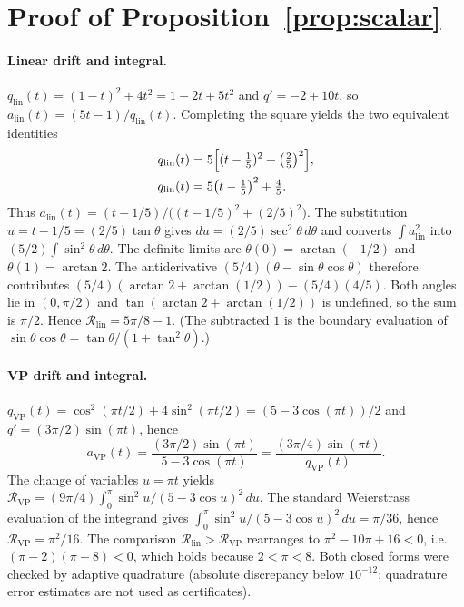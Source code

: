 \documentclass[11pt,a4paper]{article}
\theoremstyle{remark}
\newcommand{\cR}{\mathcal{R}}
\begin{document}
\FloatBarrier
{\small
\setlength{\bibsep}{3pt plus 1pt minus 1pt}


}

\appendix
{}
\setcounter{topnumber}{4}
\setcounter{bottomnumber}{3}
\setcounter{totalnumber}{6}
\renewcommand{\topfraction}{0.92}
\renewcommand{\textfraction}{0.05}
\renewcommand{\floatpagefraction}{0.85}
\setlength{\textfloatsep}{10pt plus 2pt minus 4pt}
\setlength{\floatsep}{8pt plus 2pt minus 3pt}
\setlength{\intextsep}{8pt plus 2pt minus 3pt}
\section{Proof of Proposition~\ref{prop:scalar}}
\label{app:scalar}

\paragraph{Linear drift and integral.}
$q_{\mathrm{lin}}(t)=(1-t)^2+4t^2=1-2t+5t^2$ and
$q'= -2+10t$, so
$a_{\mathrm{lin}}(t)=(5t-1)/q_{\mathrm{lin}}(t)$. Completing the square yields the two equivalent identities
\begin{align}
  q_{\mathrm{lin}}(t)
  &= 5\Bigl[(t-\tfrac15)^2+\bigl(\tfrac25\bigr)^2\Bigr],
  \label{eq:q-bracket}\\
  q_{\mathrm{lin}}(t)
  &= 5\bigl(t-\tfrac15\bigr)^2+\tfrac45.
  \label{eq:q-plus}
\end{align}
Thus
$a_{\mathrm{lin}}(t)=(t-1/5)/\bigl((t-1/5)^2+(2/5)^2\bigr)$.
The substitution $u=t-1/5=(2/5)\tan\theta$ gives
$du=(2/5)\sec^2\theta\,d\theta$ and converts $\int a_{\mathrm{lin}}^2$ into
$(5/2)\int\sin^2\theta\,d\theta$. The definite limits are
$\theta(0)=\arctan(-1/2)$ and $\theta(1)=\arctan 2$. The antiderivative
$(5/4)(\theta-\sin\theta\cos\theta)$ therefore contributes
$(5/4)(\arctan 2+\arctan(1/2))-(5/4)(4/5)$. Both angles lie in
$(0,\pi/2)$ and $\tan(\arctan 2+\arctan(1/2))$ is undefined, so the sum is
$\pi/2$. Hence $\cR_{\mathrm{lin}}=5\pi/8-1$. (The subtracted $1$ is the
boundary evaluation of $\sin\theta\cos\theta=\tan\theta/(1+\tan^2\theta)$.)

\paragraph{VP drift and integral.}
$q_{\mathrm{VP}}(t)=\cos^2(\pi t/2)+4\sin^2(\pi t/2)=(5-3\cos(\pi t))/2$ and
$q'=(3\pi/2)\sin(\pi t)$, hence
\begin{equation}
  a_{\mathrm{VP}}(t)=\frac{(3\pi/2)\sin(\pi t)}{5-3\cos(\pi t)}
  =\frac{(3\pi/4)\sin(\pi t)}{q_{\mathrm{VP}}(t)}.
\end{equation}
The change of variables $u=\pi t$ yields
$\cR_{\mathrm{VP}}=(9\pi/4)\int_0^\pi \sin^2 u/(5-3\cos u)^2\,du$. The
standard Weierstrass evaluation of the integrand gives
$\int_0^\pi \sin^2 u/(5-3\cos u)^2\,du=\pi/36$, hence
$\cR_{\mathrm{VP}}=\pi^2/16$. The comparison
$\cR_{\mathrm{lin}}>\cR_{\mathrm{VP}}$ rearranges to
$\pi^2-10\pi+16<0$, i.e.\ $(\pi-2)(\pi-8)<0$, which holds because
$2<\pi<8$. Both closed forms were checked by adaptive
quadrature (absolute discrepancy below $10^{-12}$; quadrature error
estimates are not used as certificates).
\end{document}
